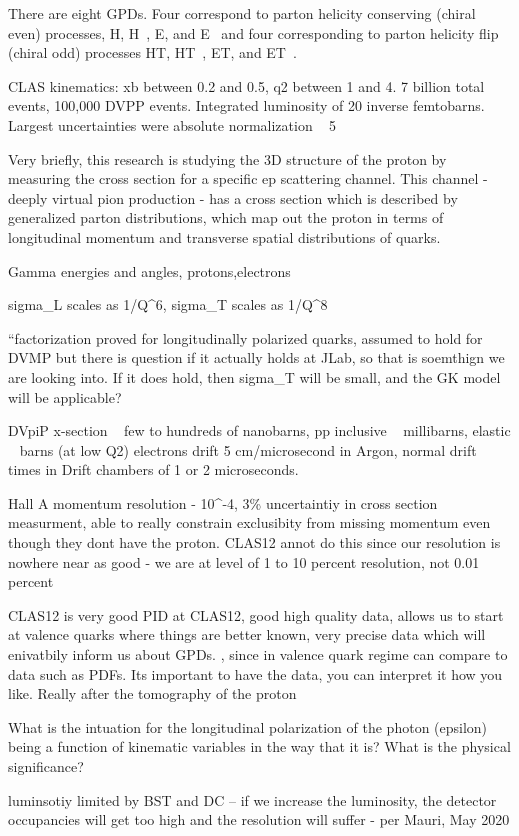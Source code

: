 There are eight GPDs. Four correspond to parton helicity conserving (chiral even) processes, H, H~, E, and E~ and four corresponding to parton helicity flip (chiral odd) processes HT, HT~, ET, and ET~. 


CLAS kinematics: xb between 0.2 and 0.5, q2 between 1 and 4. 7 billion total events, 100,000 DVPP events. Integrated luminosity of 20 inverse femtobarns. Largest uncertainties were absolute normalization ~ 5%


Very briefly, this research is  studying the 3D structure of the proton by measuring the cross section for a specific ep scattering channel. This channel - deeply virtual pion production - has a cross section which is described by generalized parton distributions, which map out the proton in terms of longitudinal momentum and transverse spatial distributions of quarks. 

  Gamma energies and angles, protons,electrons  

            
            

sigma_L scales as 1/Q^6, sigma_T scales as 1/Q^8


“factorization proved for longitudinally polarized quarks, assumed to hold for DVMP but there is question if it actually holds at JLab, so that is soemthign we are looking into. If it does hold, then sigma_T will be small, and the GK model will be applicable?

DVpiP x-section ~ few to hundreds of nanobarns, pp inclusive ~ millibarns, elastic ~ barns (at low Q2)
electrons drift 5 cm/microsecond in Argon, normal drift times in Drift chambers of 1 or 2 microseconds. 

Hall A momentum resolution - 10^-4, 3\% uncertaintiy in cross section measurment, able to really constrain exclusibity from missing momentum even though they dont have the proton. CLAS12 annot do this since our resolution is nowhere near as good - we are at level of 1 to 10 percent resolution, not 0.01 percent

CLAS12 is very good PID at CLAS12, good high quality data, allows us to start at valence quarks where things are better known, very precise data which will enivatbily inform us about GPDs. , since in valence quark regime can compare to data such as PDFs. Its important to have the data, you can interpret it how you like. Really after the tomography of the proton


What is the intuation for the longitudinal polarization of the photon (epsilon) being a function of kinematic variables in the way that it is? What is the physical significance? 


luminsotiy limited by BST and DC – if we increase the luminosity, the detector occupancies will get too high and the resolution will suffer - per Mauri, May 2020